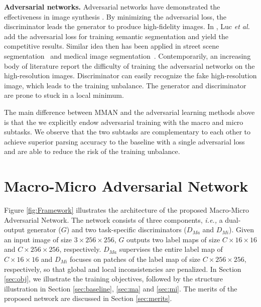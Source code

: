 \documentclass[runningheads]{llncs}
\begin{document}
\textbf{Adversarial networks.}
Adversarial networks have demonstrated the effectiveness in image synthesis \cite{isola2017image,odena2016conditional,reed2016learning,zhong2018camera,zhong2018generalizing}. By minimizing the adversarial loss, the discriminator leads the generator to produce high-fidelity images. In \cite{luc2016semantic}, Luc \emph{et al.} add the adversarial loss for training semantic segmentation and yield the competitive results. Similar idea then has been applied in street scene segmentation~\cite{hung2018adversarial} and medical image segmentation~\cite{dai2017scan,moeskops2017adversarial}.
Contemporarily, an increasing body of literature \cite{denton2015pyramid,karras2017progressive} report the difficulty of training the adversarial networks on the high-resolution images. Discriminator can easily recognize the fake high-resolution image, which leads to the training unbalance. The generator and discriminator are prone to stuck in a local minimum.


The main difference between MMAN and the adversarial learning methods above is that the we explicitly endow adversarial training with the macro and micro subtasks. We observe that the two subtasks are complementary to each other to achieve superior parsing accuracy to the baseline with a single adversarial loss and are able to reduce the risk of the training unbalance.

\section{Macro-Micro Adversarial Network}
Figure \ref{fig:Framework} illustrates the architecture of the proposed Macro-Micro Adversarial Network. The network consists of three components, \emph{i.e.,} a dual-output generator ($G$) and two task-specific discriminators ($D_{Ma}$ and $D_{Mi}$). Given an input image of size $3\times256\times 256$, $G$ outputs two label maps of size $C\times 16\times 16$ and $C\times256\times256$, respectively. $D_{Ma}$ supervises the entire label map of $C\times 16\times 16$ and $D_{Mi}$ focuses on patches of the label map of size $C\times256\times256$, respectively, so that global and local inconsistencies are penalized. In Section \ref{sec:obj}, we illustrate the training objectives, followed by the structure illustration in Section \ref{sec:baseline}, \ref{sec:ma} and \ref{sec:mi}. The merits of the proposed network are discussed in Section \ref{sec:merits}.
\end{document}
